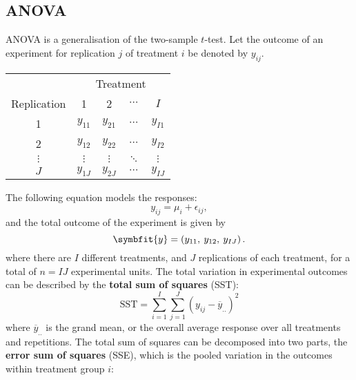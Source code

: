 \documentclass{article}
\begin{document}
\subsection{ANOVA}
ANOVA is a generalisation of the two-sample \(t\)-test. Let the outcome of an experiment for replication \(j\) of treatment \(i\)
be denoted by \(y_{ij}\).
\begin{table}[H]
    \centering
    \begin{tabular}{c | c c c c}
        \toprule
                    & \multicolumn{4}{c}{Treatment}                                        \\
        Replication & 1                             & 2          & \(\cdots\) & \(I\)      \\
        \midrule
        1           & \(y_{11}\)                    & \(y_{21}\) & \(\cdots\) & \(y_{I1}\) \\
        2           & \(y_{12}\)                    & \(y_{22}\) & \(\cdots\) & \(y_{I2}\) \\
        \(\vdots\)  & \(\vdots\)                    & \(\vdots\) & \(\ddots\) & \(\vdots\) \\
        \(J\)       & \(y_{1J}\)                    & \(y_{2J}\) & \(\cdots\) & \(y_{IJ}\) \\
        \bottomrule
    \end{tabular}
\end{table}
The following equation models the responses:
\begin{equation*}
    y_{ij} = \mu_i + \epsilon_{ij},
\end{equation*}
and the total outcome of the experiment is given by
\begin{equation*}
    \symbfit{y} = \left( y_{11},\: y_{12},\: y_{IJ} \right).
\end{equation*}
where there are \(I\) different treatments, and \(J\) replications of each treatment, for a total of \(n = IJ\) experimental units.
The total variation in experimental outcomes can be described by the \textbf{total sum of squares} (SST):
\begin{equation*}
    \mathrm{SST} = \sum_{i = 1}^I \sum_{j = 1}^J \left( y_{ij} - \overline{y}_{..} \right)^2
\end{equation*}
where \(\overline{y}_{..}\) is the grand mean, or the overall average response over all treatments and repetitions.
The total sum of squares can be decomposed into two parts, the \textbf{error sum of squares} (SSE),
which is the pooled variation in the outcomes within treatment group \(i\):
\end{document}
